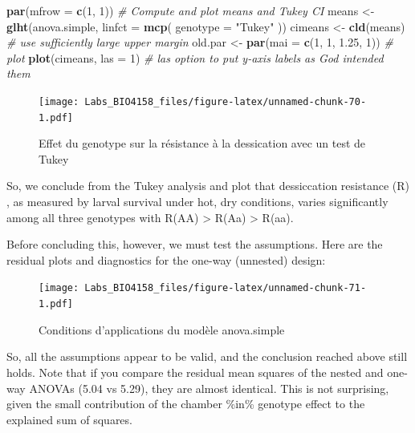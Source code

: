 \documentclass[
  12pt,
]{book}
\newenvironment{Shaded}{\begin{snugshade}}{\end{snugshade}}
\newcommand{\CommentTok}[1]{\textcolor[rgb]{0.56,0.35,0.01}{\textit{#1}}}
\newcommand{\DataTypeTok}[1]{\textcolor[rgb]{0.13,0.29,0.53}{#1}}
\newcommand{\DecValTok}[1]{\textcolor[rgb]{0.00,0.00,0.81}{#1}}
\newcommand{\FloatTok}[1]{\textcolor[rgb]{0.00,0.00,0.81}{#1}}
\newcommand{\KeywordTok}[1]{\textcolor[rgb]{0.13,0.29,0.53}{\textbf{#1}}}
\newcommand{\NormalTok}[1]{#1}
\newcommand{\StringTok}[1]{\textcolor[rgb]{0.31,0.60,0.02}{#1}}
\begin{document}
\begin{Shaded}
\begin{Highlighting}[]
\KeywordTok{par}\NormalTok{(}\DataTypeTok{mfrow =} \KeywordTok{c}\NormalTok{(}\DecValTok{1}\NormalTok{, }\DecValTok{1}\NormalTok{))}
\CommentTok{\# Compute and plot means and Tukey CI}
\NormalTok{means \textless{}{-}}\StringTok{ }\KeywordTok{glht}\NormalTok{(anova.simple, }\DataTypeTok{linfct =} \KeywordTok{mcp}\NormalTok{(}
  \DataTypeTok{genotype =}
    \StringTok{"Tukey"}
\NormalTok{))}
\NormalTok{cimeans \textless{}{-}}\StringTok{ }\KeywordTok{cld}\NormalTok{(means)}
\CommentTok{\# use sufficiently large upper margin}
\NormalTok{old.par \textless{}{-}}\StringTok{ }\KeywordTok{par}\NormalTok{(}\DataTypeTok{mai =} \KeywordTok{c}\NormalTok{(}\DecValTok{1}\NormalTok{, }\DecValTok{1}\NormalTok{, }\FloatTok{1.25}\NormalTok{, }\DecValTok{1}\NormalTok{))}
\CommentTok{\# plot}
\KeywordTok{plot}\NormalTok{(cimeans, }\DataTypeTok{las =} \DecValTok{1}\NormalTok{) }\CommentTok{\# las option to put y{-}axis labels as God intended them}
\end{Highlighting}
\end{Shaded}

\begin{figure}
\centering
\texttt{[image: Labs\_BIO4158\_files/figure-latex/unnamed-chunk-70-1.pdf]}
\caption{\label{fig:unnamed-chunk-70}Effet du genotype sur la résistance à la dessication avec un test de Tukey}
\end{figure}

So, we conclude from the Tukey analysis and plot that dessiccation resistance (R) , as measured by larval survival under hot, dry conditions, varies significantly among all three genotypes with R(AA) \textgreater{} R(Aa) \textgreater{} R(aa).

Before concluding this, however, we must test the assumptions. Here are the residual plots and diagnostics for the one-way (unnested) design:

\begin{figure}
\centering
\texttt{[image: Labs\_BIO4158\_files/figure-latex/unnamed-chunk-71-1.pdf]}
\caption{\label{fig:unnamed-chunk-71}Conditions d'applications du modèle anova.simple}
\end{figure}

So, all the assumptions appear to be valid, and the conclusion reached above still holds. Note that if you compare the residual mean squares of the nested and one-way ANOVAs (5.04 vs 5.29), they are almost identical. This is not surprising, given the small contribution of the chamber \%in\% genotype effect to the explained sum of squares.
\end{document}
